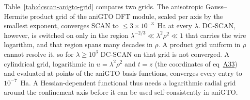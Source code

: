 \documentclass[journal=jctcce,manuscript=suppinfo]{achemso}
\begin{document}
Table~\ref{tab:dcscan-anigto-grid} compares two grids.  The anisotropic
Gauss--Hermite product grid of the aniGTO DFT module, scaled per axis by the
smallest exponent, converges SCAN to $\le3\times10^{-3}$~Ha at every $\lambda$.
DC-SCAN, however, is switched on only in the region
$\lambda^{-2/3}\ll\lambda^2\rho^2\ll1$ that carries the wire logarithm, and that
region spans many decades in $\rho$.  A product grid uniform in $\rho$ cannot
resolve it, so for $\lambda\ge10^3$ DC-SCAN on that grid is not converged.  A
cylindrical grid, logarithmic in $u=\lambda^2\rho^2$ and $t=z$ (the coordinates of
eq~\href{main.pdf\#equation.33}{A33}) and evaluated at points of the aniGTO basis functions,
converges every entry to $10^{-7}$~Ha.  A Hessian-dependent functional thus
needs a logarithmic radial grid around the confinement axis before it can be
used self-consistently in aniGTO.
\end{document}
